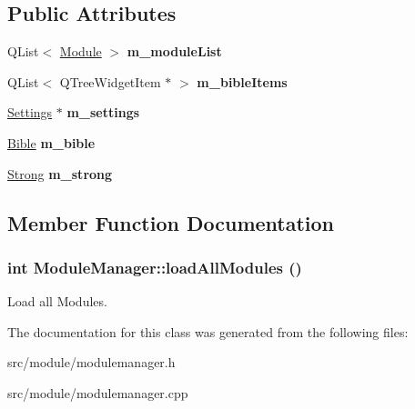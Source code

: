 \subsection*{Public Attributes}
\begin{DoxyCompactItemize}
\item 
\hypertarget{classModuleManager_a49564c04fb819e41b25c30ac6f200a6c}{
QList$<$ \hyperlink{classModule}{Module} $>$ {\bfseries m\_\-moduleList}}
\label{classModuleManager_a49564c04fb819e41b25c30ac6f200a6c}

\item 
\hypertarget{classModuleManager_a1d854408d6c37ea4e630a31f2cf33c23}{
QList$<$ QTreeWidgetItem $\ast$ $>$ {\bfseries m\_\-bibleItems}}
\label{classModuleManager_a1d854408d6c37ea4e630a31f2cf33c23}

\item 
\hypertarget{classModuleManager_a9b7b310a9ccdc0a7d438631af2d15120}{
\hyperlink{classSettings}{Settings} $\ast$ {\bfseries m\_\-settings}}
\label{classModuleManager_a9b7b310a9ccdc0a7d438631af2d15120}

\item 
\hypertarget{classModuleManager_a2d836395b4fd084ce2b813898a0bfc90}{
\hyperlink{classBible}{Bible} {\bfseries m\_\-bible}}
\label{classModuleManager_a2d836395b4fd084ce2b813898a0bfc90}

\item 
\hypertarget{classModuleManager_ad70d860a9b77caade59a097c9c28f399}{
\hyperlink{classStrong}{Strong} {\bfseries m\_\-strong}}
\label{classModuleManager_ad70d860a9b77caade59a097c9c28f399}

\end{DoxyCompactItemize}


\subsection{Member Function Documentation}
\hypertarget{classModuleManager_a5ede22110fa3280a3b08638c91cbc026}{
\subsubsection[{loadAllModules}]{\setlength{\rightskip}{0pt plus 5cm}int ModuleManager::loadAllModules ()}}
\label{classModuleManager_a5ede22110fa3280a3b08638c91cbc026}
Load all Modules. 

The documentation for this class was generated from the following files:\begin{DoxyCompactItemize}
\item 
src/module/modulemanager.h\item 
src/module/modulemanager.cpp\end{DoxyCompactItemize}
